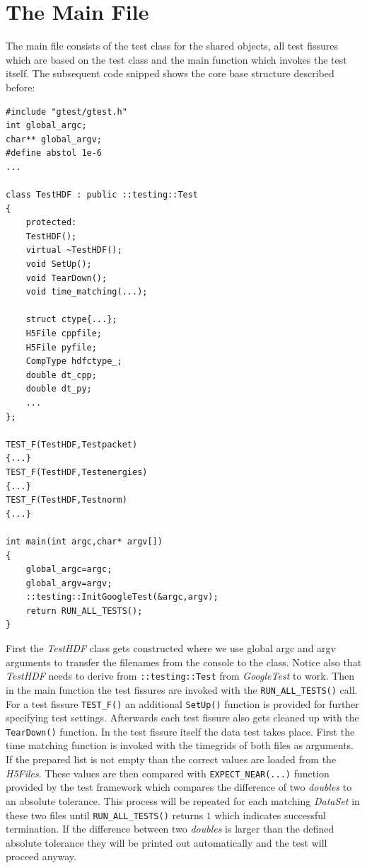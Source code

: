 \section{The Main File}
\label{seq:testmain}
The main file consists of the test class for the shared objects, all test fissures which are based on the test class and the main function which invokes the test itself. The subsequent code snipped shows the core base structure described before:

\begin{lstlisting}
#include "gtest/gtest.h"
int global_argc;
char** global_argv;
#define abstol 1e-6
...

class TestHDF : public ::testing::Test
{
	protected:
	TestHDF();
	virtual ~TestHDF();
	void SetUp();
	void TearDown();
	void time_matching(...);
	
	struct ctype{...};
	H5File cppfile;
	H5File pyfile;
	CompType hdfctype_;
	double dt_cpp;
	double dt_py;
	...
};

TEST_F(TestHDF,Testpacket)
{...}
TEST_F(TestHDF,Testenergies)
{...}
TEST_F(TestHDF,Testnorm)
{...}

int main(int argc,char* argv[])
{
	global_argc=argc;
	global_argv=argv;
	::testing::InitGoogleTest(&argc,argv);
	return RUN_ALL_TESTS();
}
\end{lstlisting}
First the \textit{TestHDF} class gets constructed where we use global argc and argv arguments to transfer the filenames from the console to the class. Notice also that \textit{TestHDF} needs to derive from \texttt{::testing::Test} from \textit{GoogleTest} to work. Then in the main function the test fissures are invoked with the \texttt{RUN\_ALL\_TESTS()} call. For a test fissure \texttt{TEST\_F()} an additional \texttt{SetUp()} function is provided for further specifying test settings. Afterwards each test fissure also gets cleaned up with the \texttt{TearDown()} function. In the test fissure itself the data test takes place. First the time matching function is invoked with the timegrids of both files as arguments. If the prepared list is not empty than the correct values are loaded from the \textit{H5Files}. These values are then compared with \texttt{EXPECT\_NEAR(...)} function provided by the test framework which compares the difference of two \textit{doubles} to an absolute tolerance. This process will be repeated for each matching \textit{DataSet} in these two files until \texttt{RUN\_ALL\_TESTS()} returns $1$ which indicates successful termination. If the difference between two \textit{doubles} is larger than the defined absolute tolerance they will be printed out automatically and the test will proceed anyway.

